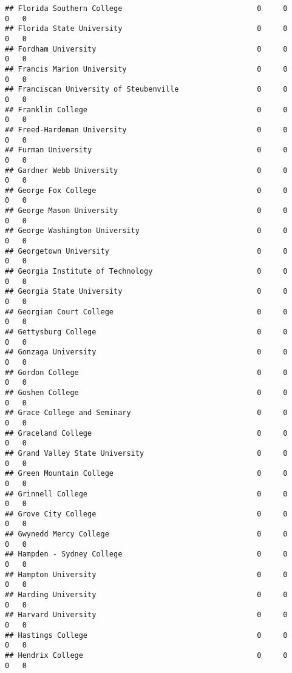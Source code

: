 \documentclass[
]{article}
\begin{document}
\begin{verbatim}
## Florida Southern College                               0     0        0   0
## Florida State University                               0     0        0   0
## Fordham University                                     0     0        0   0
## Francis Marion University                              0     0        0   0
## Franciscan University of Steubenville                  0     0        0   0
## Franklin College                                       0     0        0   0
## Freed-Hardeman University                              0     0        0   0
## Furman University                                      0     0        0   0
## Gardner Webb University                                0     0        0   0
## George Fox College                                     0     0        0   0
## George Mason University                                0     0        0   0
## George Washington University                           0     0        0   0
## Georgetown University                                  0     0        0   0
## Georgia Institute of Technology                        0     0        0   0
## Georgia State University                               0     0        0   0
## Georgian Court College                                 0     0        0   0
## Gettysburg College                                     0     0        0   0
## Gonzaga University                                     0     0        0   0
## Gordon College                                         0     0        0   0
## Goshen College                                         0     0        0   0
## Grace College and Seminary                             0     0        0   0
## Graceland College                                      0     0        0   0
## Grand Valley State University                          0     0        0   0
## Green Mountain College                                 0     0        0   0
## Grinnell College                                       0     0        0   0
## Grove City College                                     0     0        0   0
## Gwynedd Mercy College                                  0     0        0   0
## Hampden - Sydney College                               0     0        0   0
## Hampton University                                     0     0        0   0
## Harding University                                     0     0        0   0
## Harvard University                                     0     0        0   0
## Hastings College                                       0     0        0   0
## Hendrix College                                        0     0        0   0

\end{verbatim}
\end{document}
